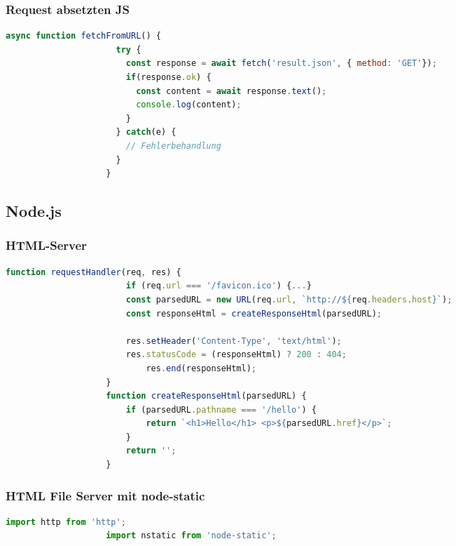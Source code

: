 \documentclass[a4paper, landscape, 8pt]{scrartcl}
\begin{document}
\begin{multicols*}{4}
        \subsubsection{Request absetzten JS}
        \begin{lstlisting}[language=JavaScript]
                    async function fetchFromURL() {
                      try {
                        const response = await fetch('result.json', { method: 'GET'});
                        if(response.ok) {
                          const content = await response.text();
                          console.log(content);
                        }
                      } catch(e) {
                        // Fehlerbehandlung
                      }
                    }
        \end{lstlisting}

        \subsection{Node.js}

        \subsubsection{HTML-Server}
        \begin{lstlisting}[language=JavaScript]
                    function requestHandler(req, res) {
                        if (req.url === '/favicon.ico') {...}
                        const parsedURL = new URL(req.url, `http://${req.headers.host}`);
                        const responseHtml = createResponseHtml(parsedURL);

                        res.setHeader('Content-Type', 'text/html');
                        res.statusCode = (responseHtml) ? 200 : 404;
                            res.end(responseHtml);
                    }
                    function createResponseHtml(parsedURL) {
                        if (parsedURL.pathname === '/hello') {
                            return `<h1>Hello</h1> <p>${parsedURL.href}</p>`;
                        }
                        return '';
                    }
        \end{lstlisting}

        \subsubsection{HTML File Server mit node-static}
        \begin{lstlisting}[language=JavaScript]
                    import http from 'http';
                    import nstatic from 'node-static';


\end{lstlisting}
\end{multicols*}
\end{document}
